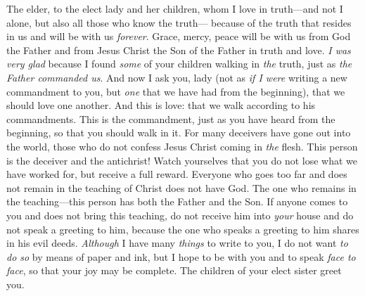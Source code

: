
\begin{biblechapter} %
 The elder, to the elect lady and her children, whom I love in truth—and not I alone, but also all those who know the truth—
\verse because of the truth that resides in us and will be with us \textit{forever}.
\verse Grace, mercy, peace will be with us from God the Father and from Jesus Christ the Son of the Father in truth and love.
\verse \textit{I was very glad} because I found \textit{some} of your children walking in \textit{the} truth, just as \textit{the Father commanded us}.
 And now I ask you, lady (not as \textit{if I were} writing a new commandment to you, but \textit{one} that we have had from the beginning), that we should love one another.
\verse And this is love: that we walk according to his commandments. This is the commandment, just as you have heard from the beginning, so that you should walk in it.
\verse For many deceivers have gone out into the world, those who do not confess Jesus Christ coming in \textit{the} flesh. This person is the deceiver and the antichrist!
\verse Watch yourselves that you do not lose what we have worked for, but receive a full reward.
\verse Everyone who goes too far and does not remain in the teaching of Christ does not have God. The one who remains in the teaching—this person has both the Father and the Son.
\verse If anyone comes to you and does not bring this teaching, do not receive him into \textit{your} house and do not speak a greeting to him,
\verse because the one who speaks a greeting to him shares in his evil deeds.
 \textit{Although} I have many \textit{things} to write to you, I do not want \textit{to do so} by means of paper and ink, but I hope to be with you and to speak \textit{face to face}, so that your joy may be complete.
\verse The children of your elect sister greet you.
\end{biblechapter}

